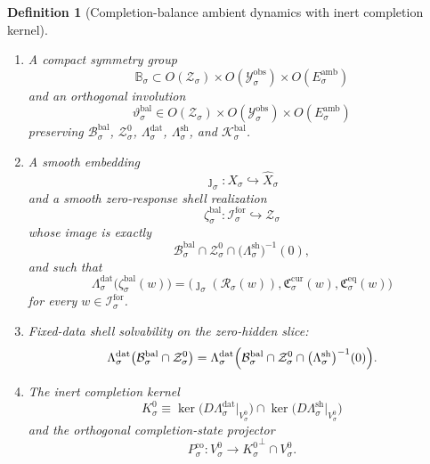 \documentclass[11pt]{article}
\newcommand{\ForSpace}[1]{\mathcal I_{#1}^{\mathrm{for}}}
\newcommand{\Reduction}[1]{\mathcal R_{#1}}
\newcommand{\CurrentCarrier}[1]{\mathfrak C_{#1}^{\mathrm{cur}}}
\newcommand{\EqCarrier}[1]{\mathfrak C_{#1}^{\mathrm{eq}}}
\newcommand{\VisibleAffine}[1]{\widehat X_{#1}}
\newcommand{\DataSpace}[1]{\mathcal Y_{#1}^{\mathrm{obs}}}
\newcommand{\AmbientTarget}[1]{E_{#1}^{\mathrm{amb}}}
\newcommand{\BalSpace}[1]{\mathcal Z_{#1}}
\newcommand{\BalBody}[1]{\mathcal B_{#1}^{\mathrm{bal}}}
\newcommand{\BalData}[1]{\Lambda_{#1}^{\mathrm{dat}}}
\newcommand{\BalShell}[1]{\Lambda_{#1}^{\mathrm{sh}}}
\newcommand{\ZeroHiddenSlice}[1]{\mathcal Z_{#1}^{0}}
\newcommand{\ZeroHiddenVec}[1]{V_{#1}^{0}}
\newcommand{\Kernel}[1]{K_{#1}^{0}}
\newcommand{\BalOp}[1]{\mathcal K_{#1}^{\mathrm{bal}}}
\newcommand{\BalSym}[1]{\mathbb B_{#1}}
\newcommand{\BalTime}[1]{\vartheta_{#1}^{\mathrm{bal}}}
\newcommand{\BalEmbed}[1]{\zeta_{#1}^{\mathrm{bal}}}
\newcommand{\StateComp}[1]{P_{#1}^{\mathrm{co}}}
\newcommand{\GapBody}[1]{D_{#1}}
\newtheorem{definition}{Definition}
\begin{document}
\begin{definition}[Completion-balance ambient dynamics with inert completion kernel]
\begin{enumerate}
\[    \]
    and the ambient admissible body splits exactly as
    \begin{equation}
    \BalBody{\sigma}
    =
    \left\{
    z+\eta:
    z\in\BalBody{\sigma}\cap\ZeroHiddenSlice{\sigma},
    \quad
    \eta\in\GapBody{\sigma}
    \right\}.
    \label{eq:bodysplitting}
    \end{equation}
    \item A compact symmetry group
    \[
    \BalSym{\sigma}\subset
    O(\BalSpace{\sigma})\times
    O(\DataSpace{\sigma})\times
    O(\AmbientTarget{\sigma})
    \]
    and an orthogonal involution
    \[
    \BalTime{\sigma}\in
    O(\BalSpace{\sigma})\times
    O(\DataSpace{\sigma})\times
    O(\AmbientTarget{\sigma})
    \]
    preserving \(\BalBody{\sigma}\), \(\ZeroHiddenSlice{\sigma}\), \(\BalData{\sigma}\), \(\BalShell{\sigma}\), and \(\BalOp{\sigma}\).
    \item A smooth embedding
    \[
    \jmath_{\sigma}:X_{\sigma}\hookrightarrow\VisibleAffine{\sigma}
    \]
    and a smooth zero-response shell realization
    \[
    \BalEmbed{\sigma}:\ForSpace{\sigma}\hookrightarrow\BalSpace{\sigma}
    \]
    whose image is exactly
    \[
    \BalBody{\sigma}\cap
    \ZeroHiddenSlice{\sigma}\cap
    \bigl(\BalShell{\sigma}\bigr)^{-1}(0),
    \]
    and such that
    \begin{equation}
    \BalData{\sigma}\bigl(\BalEmbed{\sigma}(w)\bigr)
    =
    \bigl(
    \jmath_{\sigma}(\Reduction{\sigma}(w)),
    \CurrentCarrier{\sigma}(w),
    \EqCarrier{\sigma}(w)
    \bigr)
    \label{eq:ambientcompat}
    \end{equation}
    for every \(w\in\ForSpace{\sigma}\).
    \item Fixed-data shell solvability on the zero-hidden slice:
    \begin{equation}
    \BalData{\sigma}\bigl(
    \BalBody{\sigma}\cap\ZeroHiddenSlice{\sigma}
    \bigr)
    =
    \BalData{\sigma}\Bigl(
    \BalBody{\sigma}\cap
    \ZeroHiddenSlice{\sigma}\cap
    \bigl(\BalShell{\sigma}\bigr)^{-1}(0)
    \Bigr).
    \label{eq:ambientsolvability}
    \end{equation}
    \item The inert completion kernel
    \[
    \Kernel{\sigma}
    \equiv
    \ker\bigl(D\BalData{\sigma}\big|_{\ZeroHiddenVec{\sigma}}\bigr)
    \cap
    \ker\bigl(D\BalShell{\sigma}\big|_{\ZeroHiddenVec{\sigma}}\bigr)
    \]
    and the orthogonal completion-state projector
    \[
    \StateComp{\sigma}:\ZeroHiddenVec{\sigma}\to{\Kernel{\sigma}}^{\perp}\cap\ZeroHiddenVec{\sigma}.
\]
\end{enumerate}
\end{definition}
\end{document}
